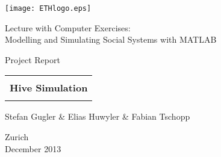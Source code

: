 
\thispagestyle{empty}

\begin{center}
	\texttt{[image: ETHlogo.eps]}
	
	\bigskip
	
	
	\bigskip
	
	
	\bigskip
	
	
	\LARGE{ 	Lecture with Computer Exercises:\\ }
	\LARGE{ Modelling and Simulating Social Systems with MATLAB\\}
	
	\bigskip
	
	\bigskip
	
	\small{Project Report}\\
	
	\bigskip
	
	\bigskip
	
	\bigskip
	
	\bigskip
	
	
	\begin{tabular}{|c|}
		\hline
		\\
		\textbf{\LARGE{Hive Simulation}}\\
		\\
		\hline
	\end{tabular}
	\bigskip
	
	\bigskip
	
	\bigskip
	
	\LARGE{Stefan Gugler \& Elias Huwyler \& Fabian Tschopp}
	
	\bigskip
	
	\bigskip
	
	\bigskip
	
	\bigskip
	
	\bigskip
	
	\bigskip
	
	\bigskip
	
	\bigskip
	
	Zurich\\
	December 2013\\
\end{center}


